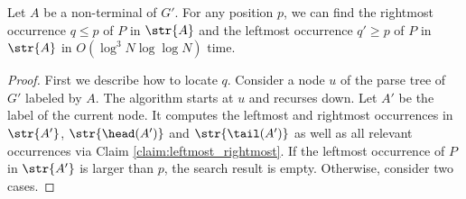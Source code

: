 \begin{lemma}\label{lm:predecessor}
Let $A$ be a non-terminal of $G'$. For any position $p$, we can find the rightmost occurrence $q \le p$ of $P$ in $\str{A}$ and the leftmost occurrence $q'\geq p$ of $P$ in $\str{A}$ in $O(\log^{3} N\log \log N)$ time.  
\end{lemma}
\begin{proof}
First we describe how to locate $q$. Consider a node $u$ of the parse tree of $G'$ labeled by $A$. The algorithm starts at $u$ and recurses down. Let $A'$ be the label of the current node. It computes the leftmost and rightmost occurrences in $\str{A'}$, $\str{\head(A')}$ and $\str{\tail(A')}$ as well as all relevant occurrences via Claim \ref{claim:leftmost_rightmost}. If the leftmost occurrence of $P$ in $\str{A'}$ is larger than $p$, the search result is empty. Otherwise, consider two cases. 


\end{proof}
